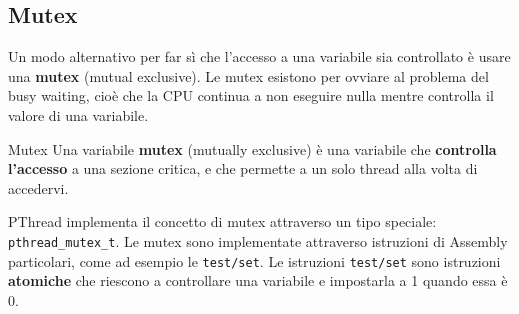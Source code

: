 \subsection{Mutex}

Un modo alternativo per far sì che l'accesso a una variabile sia controllato è usare una \textbf{mutex} (mutual exclusive). Le mutex esistono per ovviare al problema del busy waiting, cioè che la CPU continua a non eseguire nulla mentre controlla il valore di una variabile.

\begin{definition}{Mutex}
    Una variabile \textbf{mutex} (mutually exclusive) è una variabile che \textbf{controlla l'accesso} a una sezione critica, e che permette a un solo thread alla volta di accedervi.
\end{definition}

PThread implementa il concetto di mutex attraverso un tipo speciale: \verb|pthread_mutex_t|. Le mutex sono implementate attraverso istruzioni di Assembly particolari, come ad esempio le \texttt{test/set}. Le istruzioni \texttt{test/set} sono istruzioni \textbf{atomiche} che riescono a controllare una variabile e impostarla a 1 quando essa è 0. 